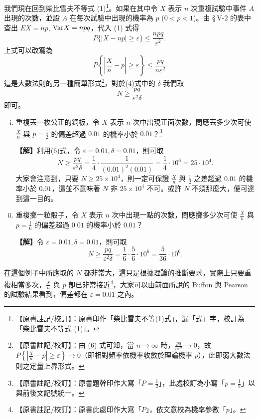 我們現在回到柴比雪夫不等式 (1)\label{note:b5s-ch5-p166-ineq1}\footnote{【原書註記/校訂】：原書印作「柴比雪夫不等(1)式」，漏「式」字，校訂為「柴比雪夫不等式 (1)」。}。如果在其中令 $X$ 表示 $n$ 次重複試驗中事件 $A$ 出現的次數，並設 $A$ 在每次試驗中出現的機率為 $p$ ($0 < p < 1$)。由 \S\,V-2 的表中查出 $EX = np$, $\text{Var} X = npq$，代入 (1) 式得
\[
P\{|X - np| \ge \varepsilon\} \le \frac{npq}{\varepsilon^2}.
\]
上式可以改寫為
\begin{equation}
P\left\{\left|\frac{X}{n} - p\right| \ge \varepsilon\right\} \le \frac{pq}{n\varepsilon^2} \tag{6}\label{eq:b5s-5-3-6}
\end{equation}
這是大數法則的另一種簡單形式\label{note:b5s-ch5-p166-wlln}\footnote{【原書註記/校訂】：由 (6) 式可知，當 $n \to \infty$ 時，$\frac{pq}{n\varepsilon^2} \longrightarrow 0$，故 $P\left\{\left|\frac{X}{n} - p\right| \ge \varepsilon\right\} \longrightarrow 0$（即相對頻率依機率收斂於理論機率 $p$），此即弱大數法則之定量上界形式。}，對於(4)式中的 $\delta$ 我們取
\[
N \ge \frac{pq}{\varepsilon^2 \delta}
\]
即可。

\medskip
\begin{example}\label{ex:b5s-5-18}
\begin{enumerate}[(i), leftmargin=2.5em, itemsep=0.5em]
  \item 重複丟一枚公正的銅板，令 $X$ 表示 $n$ 次中出現正面次數，問應丟多少次可使 $\frac{X}{n}$ 與 $p = \frac{1}{2}$ 的偏差超過 $0.01$ 的機率小於 $0.01$？\label{note:b5s-ch5-p166-p}\footnote{【原書註記/校訂】：原書題幹印作大寫「$P = \frac{1}{2}$」，此處校訂為小寫「$p = \frac{1}{2}$」以與前後文記號統一。}
  \par\smallskip\noindent\textbf{【解】}\quad 利用(6)式，令 $\varepsilon = 0.01, \delta = 0.01$，則可取
  \[
  N \ge \frac{pq}{\varepsilon^2 \delta} = \frac{1}{4} \cdot \frac{1}{(0.01)^2 (0.01)} = \frac{1}{4} \cdot 10^6 = 25 \cdot 10^4.
  \]
  大家會注意到，只要 $N \ge 25 \times 10^4$，則一定可保證 $\frac{X}{n}$ 與 $\frac{1}{2}$ 之差超過 $0.01$ 的機率小於 $0.01$，這並不意味著 $N$ 非 $25 \times 10^4$ 不可。或許 $N$ 不須那麼大，便可達到這一目的。

  \item 重複擲一粒骰子，令 $X$ 表示 $n$ 次中出現一點的次數，問應擲多少次可使 $\frac{X}{n}$ 與 $p = \frac{1}{6}$ 的偏差超過 $0.01$ 的機率小於 $0.01$？
  \par\smallskip\noindent\textbf{【解】}\quad 令 $\varepsilon = 0.01, \delta = 0.01$，則可取
  \[
  N \ge \frac{pq}{\varepsilon^2 \delta} = \frac{1}{6} \cdot \frac{5}{6} \cdot 10^6 = \frac{5}{36} \cdot 10^6.
  \]
\end{enumerate}
\end{example}

在這個例子中所應取的 $N$ 都非常大，這只是根據理論的推斷要求，實際上只要重複相當多次，$\frac{X}{n}$ 與 $p$ 卽已非常接近\label{note:b5s-ch5-p167-p}\footnote{【原書註記/校訂】：原書此處印作大寫「$P$」，依文意校為機率參數「$p$」。}，大家可以由前面所說的 Buffon 與 Pearson 的試驗結果看到，偏差都在 $\varepsilon = 0.01$ 之內。
